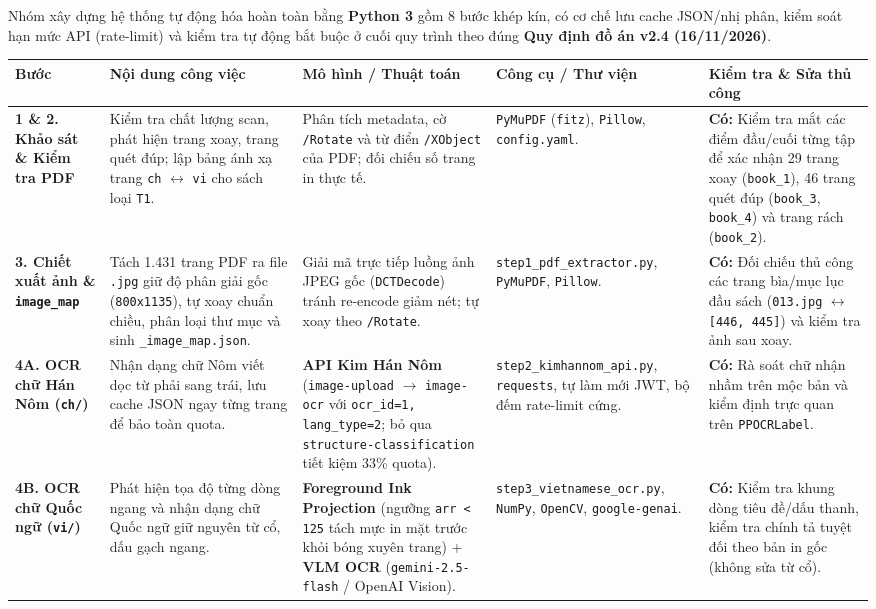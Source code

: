 \documentclass[12pt,a4paper]{article}
\begin{document}
Nhóm xây dựng hệ thống tự động hóa hoàn toàn bằng \textbf{Python 3} gồm 8 bước khép kín, có cơ chế lưu cache JSON/nhị phân, kiểm soát hạn mức API (rate-limit) và kiểm tra tự động bắt buộc ở cuối quy trình theo đúng \textbf{Quy định đồ án v2.4 (16/11/2026)}.

\begin{longtable}{>{\raggedright\arraybackslash}p{2.4cm} >{\raggedright\arraybackslash}p{3.8cm} >{\raggedright\arraybackslash}p{4.3cm} >{\raggedright\arraybackslash}p{2.7cm} >{\raggedright\arraybackslash}p{3.0cm}}
\toprule
\textbf{Bước} & \textbf{Nội dung công việc} & \textbf{Mô hình / Thuật toán} & \textbf{Công cụ / Thư viện} & \textbf{Kiểm tra \& Sửa thủ công} \\
\midrule
\endhead
\textbf{1 \& 2. Khảo sát \& Kiểm tra PDF} & Kiểm tra chất lượng scan, phát hiện trang xoay, trang quét đúp; lập bảng ánh xạ trang \texttt{ch} $\leftrightarrow$ \texttt{vi} cho sách loại \texttt{T1}. & Phân tích metadata, cờ \texttt{/Rotate} và từ điển \texttt{/XObject} của PDF; đối chiếu số trang in thực tế. & \texttt{PyMuPDF} (\texttt{fitz}), \texttt{Pillow}, \texttt{config.yaml}. & \textbf{Có:} Kiểm tra mắt các điểm đầu/cuối từng tập để xác nhận 29 trang xoay (\texttt{book\_1}), 46 trang quét đúp (\texttt{book\_3}, \texttt{book\_4}) và trang rách (\texttt{book\_2}). \\
\midrule
\textbf{3. Chiết xuất ảnh \& \texttt{image\_map}} & Tách 1.431 trang PDF ra file \texttt{.jpg} giữ độ phân giải gốc (\texttt{800x1135}), tự xoay chuẩn chiều, phân loại thư mục và sinh \texttt{\_image\_map.json}. & Giải mã trực tiếp luồng ảnh JPEG gốc (\texttt{DCTDecode}) tránh re-encode giảm nét; tự xoay theo \texttt{/Rotate}. & \texttt{step1\_pdf\_extractor.py}, \texttt{PyMuPDF}, \texttt{Pillow}. & \textbf{Có:} Đối chiếu thủ công các trang bìa/mục lục đầu sách (\texttt{013.jpg} $\leftrightarrow$ \texttt{[446, 445]}) và kiểm tra ảnh sau xoay. \\
\midrule
\textbf{4A. OCR chữ Hán Nôm (\texttt{ch/})} & Nhận dạng chữ Nôm viết dọc từ phải sang trái, lưu cache JSON ngay từng trang để bảo toàn quota. & \textbf{API Kim Hán Nôm} (\texttt{image-upload} $\to$ \texttt{image-ocr} với \texttt{ocr\_id=1, lang\_type=2}; bỏ qua \texttt{structure-classification} tiết kiệm 33\% quota). & \texttt{step2\_kimhannom\_api.py}, \texttt{requests}, tự làm mới JWT, bộ đếm rate-limit cứng. & \textbf{Có:} Rà soát chữ nhận nhầm trên mộc bản và kiểm định trực quan trên \texttt{PPOCRLabel}. \\
\midrule
\textbf{4B. OCR chữ Quốc ngữ (\texttt{vi/})} & Phát hiện tọa độ từng dòng ngang và nhận dạng chữ Quốc ngữ giữ nguyên từ cổ, dấu gạch ngang. & \textbf{Foreground Ink Projection} (ngưỡng \texttt{arr < 125} tách mực in mặt trước khỏi bóng xuyên trang) + \textbf{VLM OCR} (\texttt{gemini-2.5-flash} / OpenAI Vision). & \texttt{step3\_vietnamese\_ocr.py}, \texttt{NumPy}, \texttt{OpenCV}, \texttt{google-genai}. & \textbf{Có:} Kiểm tra khung dòng tiêu đề/dấu thanh, kiểm tra chính tả tuyệt đối theo bản in gốc (không sửa từ cổ). \\

\end{longtable}
\end{document}
